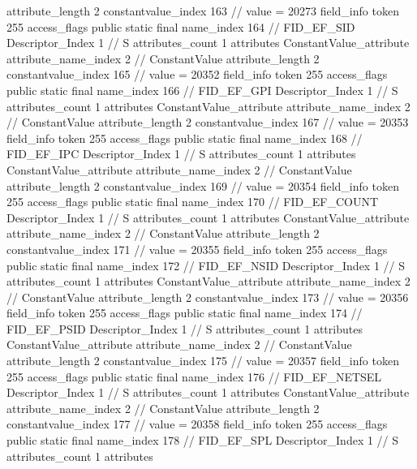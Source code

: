 {{{{{{{					attribute_length	2
					constantvalue_index	163		// value = 20273
				}
				}
			}
			field_info {
				token	255
				access_flags	public static final
				name_index	164		// FID_EF_SID
				Descriptor_Index	1		// S
				attributes_count	1
				attributes {
				ConstantValue_attribute {
					attribute_name_index	2		// ConstantValue
					attribute_length	2
					constantvalue_index	165		// value = 20352
				}
				}
			}
			field_info {
				token	255
				access_flags	public static final
				name_index	166		// FID_EF_GPI
				Descriptor_Index	1		// S
				attributes_count	1
				attributes {
				ConstantValue_attribute {
					attribute_name_index	2		// ConstantValue
					attribute_length	2
					constantvalue_index	167		// value = 20353
				}
				}
			}
			field_info {
				token	255
				access_flags	public static final
				name_index	168		// FID_EF_IPC
				Descriptor_Index	1		// S
				attributes_count	1
				attributes {
				ConstantValue_attribute {
					attribute_name_index	2		// ConstantValue
					attribute_length	2
					constantvalue_index	169		// value = 20354
				}
				}
			}
			field_info {
				token	255
				access_flags	public static final
				name_index	170		// FID_EF_COUNT
				Descriptor_Index	1		// S
				attributes_count	1
				attributes {
				ConstantValue_attribute {
					attribute_name_index	2		// ConstantValue
					attribute_length	2
					constantvalue_index	171		// value = 20355
				}
				}
			}
			field_info {
				token	255
				access_flags	public static final
				name_index	172		// FID_EF_NSID
				Descriptor_Index	1		// S
				attributes_count	1
				attributes {
				ConstantValue_attribute {
					attribute_name_index	2		// ConstantValue
					attribute_length	2
					constantvalue_index	173		// value = 20356
				}
				}
			}
			field_info {
				token	255
				access_flags	public static final
				name_index	174		// FID_EF_PSID
				Descriptor_Index	1		// S
				attributes_count	1
				attributes {
				ConstantValue_attribute {
					attribute_name_index	2		// ConstantValue
					attribute_length	2
					constantvalue_index	175		// value = 20357
				}
				}
			}
			field_info {
				token	255
				access_flags	public static final
				name_index	176		// FID_EF_NETSEL
				Descriptor_Index	1		// S
				attributes_count	1
				attributes {
				ConstantValue_attribute {
					attribute_name_index	2		// ConstantValue
					attribute_length	2
					constantvalue_index	177		// value = 20358
				}
				}
			}
			field_info {
				token	255
				access_flags	public static final
				name_index	178		// FID_EF_SPL
				Descriptor_Index	1		// S
				attributes_count	1
				attributes {
}}}}}}
